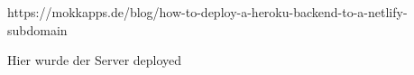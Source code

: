 
https://mokkapps.de/blog/how-to-deploy-a-heroku-backend-to-a-netlify-subdomain

Hier wurde der Server deployed